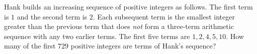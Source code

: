 Hank builds an increasing sequence of positive integers as follows. The first term is $1$ and the second term is $2$. Each subsequent term is the smallest integer greater than the previous term that does \emph{not} form a three-term arithmetic sequence with any two earlier terms. The first five terms are $1,2,4,5,10$. How many of the first $729$ positive integers are terms of Hank's sequence?
